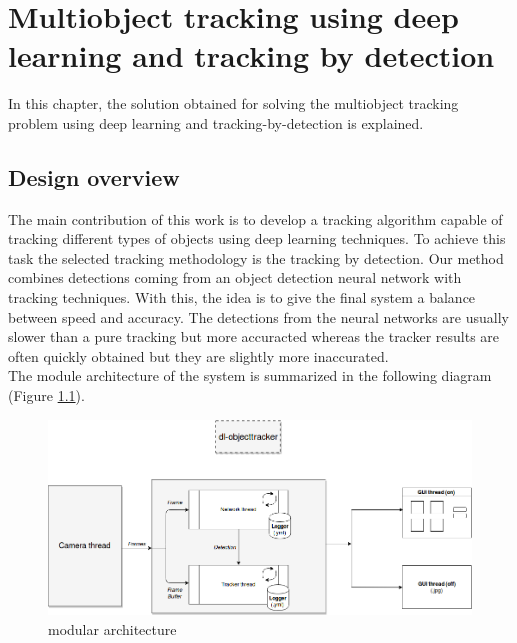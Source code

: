 \chapter{Multiobject tracking using deep learning and tracking by detection}
In this chapter, the solution obtained for solving the multiobject tracking problem using deep learning and tracking-by-detection is explained.

\section{Design overview}
The main contribution of this work is to develop a tracking algorithm capable of tracking different types of objects using deep learning techniques. To achieve this task the selected tracking methodology is the tracking by detection. Our method combines detections coming from an object detection neural network with tracking techniques. With this, the idea is to give the final system a balance between speed and accuracy. The detections from the neural networks are usually slower than a pure tracking but more accuracted whereas the tracker results are often quickly obtained but they are slightly more inaccurated.\\
The module architecture of the system is summarized in the following diagram (Figure \ref{fig:general}).
\begin{figure}[H]
\begin{center}
\includegraphics[scale=0.4]{figures/general.png}
\caption{modular architecture}
\label{fig:general}
\end{center}
\end{figure}

